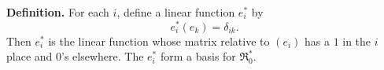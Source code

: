 \textbf{Definition.} For each $i$, define a linear function $e_i^*$ by
$$e_i^*(e_k) = \delta_{ik}.$$
Then $e_i^*$ is the linear function whose matrix relative to $(e_i)$ has a $1$ in the $i$ place and $0$'s elsewhere. The $e_i^*$ form a basis for $\mathfrak{R}_0^*$.
